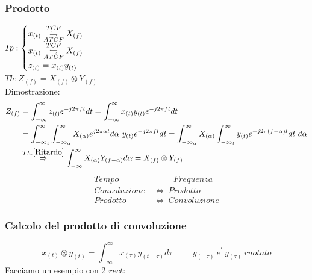         \subsubsection{Prodotto}\label{Prodotto}
            $Ip:\begin{cases}
                x_{(t)}\overunderset{TCF}{ATCF}{\leftrightharpoons} X_{(f)} \\
                x_{(t)}\overunderset{TCF}{ATCF}{\leftrightharpoons} X_{(f)} \\
                z_{(t)} = x_{(t)}y_{(t)}   
            \end{cases}$\\
            $Th: Z_{(f)} = X_{(f)}\otimes Y_{(f)} $ \\
            Dimostrazione:
                \begin{align}
                    Z_{(f)} &= \int_{-\infty}^{\infty} z_{(t)} e^{-j2\pi ft} dt = \int_{-\infty}^{\infty}x_{(t)}y_{(t)} e^{-j2\pi ft} dt \nonumber \\
                            &= \int_{-\infty_{t}}^{\infty} \int_{-\infty_{\alpha}}^{\infty}X_{(\alpha)}e^{j2\pi \alpha t} d\alpha\ y_{(t)}e^{-j2\pi ft} dt =\int_{-\infty_{\alpha}}^{\infty}X_{(\alpha)} \int_{-\infty_{t}}^{\infty}y_{(t)}e^{-j2\pi (f-\alpha)t} dt\ d\alpha\nonumber \\
                            &\overset{Th. \ref{Ritardo}}{\Rightarrow} \int_{-\infty}^{\infty}X_{(\alpha)}Y_{(f-\alpha)}  d\alpha = X_{(f)}\otimes Y_{(f)} \nonumber 
                \end{align}
            \begin{align}
                Tempo&\hspace{1cm} Frequenza \nonumber \\ 
                Convoluzione\ &\Longleftrightarrow \ Prodotto \nonumber \\ 
                Prodotto\ &\Longleftrightarrow \ Convoluzione \nonumber 
            \end{align}
        \subsubsection{Calcolo del prodotto di convoluzione}\label{Calcolo del prodotto di convoluzione}
        \[
            x_{(t)} \otimes  y_{(t)} = \int_{-\infty}^{\infty} x_{(\tau)}y_{(t-\tau)} d\tau \hspace{1cm} y_{(-\tau)}\ e^\prime\ y_{(\tau)}\ ruotato 
        \]
        Facciamo un esempio con 2 $rect$:\\

